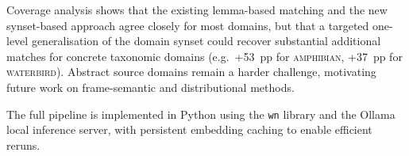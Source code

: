 \documentclass[11pt,a4paper]{article}
\begin{document}
Coverage analysis shows that the existing lemma-based matching and the
new synset-based approach agree closely for most domains, but that a
targeted one-level generalisation of the domain synset could recover
substantial additional matches for concrete taxonomic domains
(e.g.\ +53~pp for \textsc{amphibian}, +37~pp for \textsc{waterbird}).
Abstract source domains remain a harder challenge, motivating future
work on frame-semantic and distributional methods.

The full pipeline is implemented in Python using the \texttt{wn} library
and the Ollama local inference server, with persistent embedding caching
to enable efficient reruns.



\end{document}
